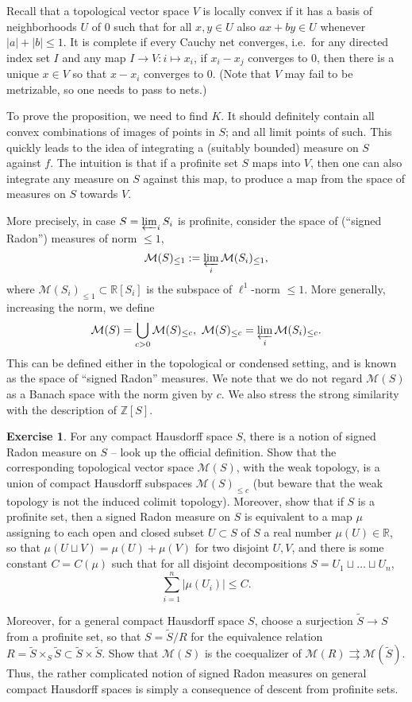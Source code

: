 \documentclass[11pt]{amsbook}
\renewcommand*{\tilde}{\widetilde}
\numberwithin{equation}{section}
\numberwithin{theorem}{section}
\theoremstyle{definition}
\newtheorem{exercise}[theorem]{Exercise}
\begin{document}
Recall that a topological vector space $V$ is locally convex if it has a basis of neighborhoods $U$ of $0$ such that for all $x,y\in U$ also $ax+by\in U$ whenever $|a|+|b|\leq 1$. It is complete if every Cauchy net converges, i.e.~for any directed index set $I$ and any map $I\to V: i\mapsto x_i$, if $x_i-x_j$ converges to $0$, then there is a unique $x\in V$ so that $x-x_i$ converges to $0$. (Note that $V$ may fail to be metrizable, so one needs to pass to nets.)

To prove the proposition, we need to find $K$. It should definitely contain all convex combinations of images of points in $S$; and all limit points of such. This quickly leads to the idea of integrating a (suitably bounded) measure on $S$ against $f$. The intuition is that if a profinite set $S$ maps into $V$, then one can also integrate any measure on $S$ against this map, to produce a map from the space of measures on $S$ towards $V$.

More precisely, in case $S=\varprojlim_i S_i$ is profinite, consider the space of (``signed Radon'') measures of norm $\leq 1$,
\[
\mathcal M(S)_{\leq 1} := \varprojlim_i \mathcal M(S_i)_{\leq 1},
\]
where $\mathcal M(S_i)_{\leq 1}\subset \mathbb R[S_i]$ is the subspace of $\ell^1$-norm $\leq 1$. More generally, increasing the norm, we define
\[
\mathcal M(S) = \bigcup_{c>0} \mathcal M(S)_{\leq c},\ \mathcal M(S)_{\leq c} = \varprojlim_i \mathcal M(S_i)_{\leq c}.
\]
This can be defined either in the topological or condensed setting, and is known as the space of ``signed Radon'' measures. We note that we do not regard $\mathcal M(S)$ as a Banach space with the norm given by $c$. We also stress the strong similarity with the description of $\mathbb Z[S]$.

\begin{exercise} For any compact Hausdorff space $S$, there is a notion of signed Radon measure on $S$ -- look up the official definition. Show that the corresponding topological vector space $\mathcal M(S)$, with the weak topology, is a union of compact Hausdorff subspaces $\mathcal M(S)_{\leq c}$ (but beware that the weak topology is not the induced colimit topology). Moreover, show that if $S$ is a profinite set, then a signed Radon measure on $S$ is equivalent to a map $\mu$ assigning to each open and closed subset $U\subset S$ of $S$ a real number $\mu(U)\in \mathbb R$, so that $\mu(U\sqcup V)=\mu(U)+\mu(V)$ for two disjoint $U,V$, and there is some constant $C=C(\mu)$ such that for all disjoint decompositions $S=U_1\sqcup\ldots\sqcup U_n$,
\[
\sum_{i=1}^n |\mu(U_i)|\leq C.
\]

Moreover, for a general compact Hausdorff space $S$, choose a surjection $\tilde{S}\to S$ from a profinite set, so that $S=\tilde{S}/R$ for the equivalence relation $R=\tilde{S}\times_S \tilde{S}\subset \tilde{S}\times \tilde{S}$. Show that $\mathcal M(S)$ is the coequalizer of $\mathcal M(R)\rightrightarrows \mathcal M(\tilde{S})$. Thus, the rather complicated notion of signed Radon measures on general compact Hausdorff spaces is simply a consequence of descent from profinite sets.
\end{exercise}
\end{document}
